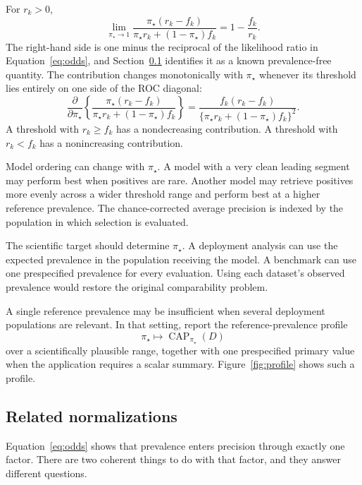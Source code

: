 \documentclass[11pt]{article}
\newcommand{\CAP}{\operatorname{CAP}}
\newcommand{\Tpi}{\CAP_{\pi_\star}}
\theoremstyle{remark}
\begin{document}
For $r_k>0$,
\begin{equation}
\lim_{\pi_\star\to1}
\frac{\pi_\star(r_k-f_k)}
{\pi_\star r_k+(1-\pi_\star)f_k}
=
1-\frac{f_k}{r_k}.
\label{eq:precg-limit}
\end{equation}
The right-hand side is one minus the reciprocal of the likelihood ratio in Equation~\eqref{eq:odds}, and Section~\ref{sec:related-normalizations} identifies it as a known prevalence-free quantity. The contribution changes monotonically with $\pi_\star$ whenever its threshold lies entirely on one side of the ROC diagonal:
\begin{equation}
\frac{\partial}{\partial\pi_\star}
\left\{
\frac{\pi_\star(r_k-f_k)}
{\pi_\star r_k+(1-\pi_\star)f_k}
\right\}
=
\frac{f_k(r_k-f_k)}
{\{\pi_\star r_k+(1-\pi_\star)f_k\}^2}.
\label{eq:reference-prevalence-derivative}
\end{equation}
A threshold with $r_k\geq f_k$ has a nondecreasing contribution. A threshold with $r_k<f_k$ has a nonincreasing contribution.

Model ordering can change with $\pi_\star$. A model with a very clean leading segment may perform best when positives are rare. Another model may retrieve positives more evenly across a wider threshold range and perform best at a higher reference prevalence. The chance-corrected average precision is indexed by the population in which selection is evaluated.

The scientific target should determine $\pi_\star$. A deployment analysis can use the expected prevalence in the population receiving the model. A benchmark can use one prespecified prevalence for every evaluation. Using each dataset's observed prevalence would restore the original comparability problem.

A single reference prevalence may be insufficient when several deployment populations are relevant. In that setting, report the reference-prevalence profile
\[
\pi_\star
\longmapsto
\Tpi(D)
\]
over a scientifically plausible range, together with one prespecified primary value when the application requires a scalar summary. Figure~\ref{fig:profile} shows such a profile.

\subsection{Related normalizations}
\label{sec:related-normalizations}

Equation~\eqref{eq:odds} shows that prevalence enters precision through exactly one factor. There are two coherent things to do with that factor, and they answer different questions.
\end{document}
